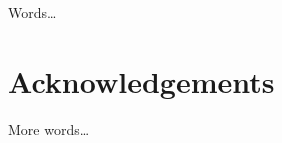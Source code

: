 \documentclass[conference]{IEEEtran}
\begin{document}
Words\ldots

\section{Acknowledgements}

More words\ldots




\end{document}
